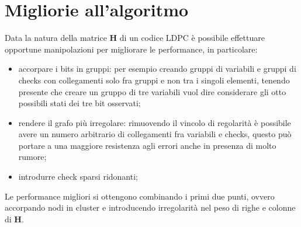 	\section{Migliorie all'algoritmo}

	Data la natura della matrice \textbf{H} di un codice LDPC è possibile effettuare opportune manipolazioni per migliorare le performance, in particolare:

	\begin{itemize}
		\item accorpare i bits in gruppi: per esempio creando gruppi di variabili e gruppi di checks con collegamenti solo fra gruppi e non tra i singoli elementi, tenendo presente che creare un gruppo di tre variabili vuol dire considerare gli otto possibili stati dei tre bit osservati;
		\item rendere il grafo più irregolare: rimuovendo il vincolo di regolarità è possibile avere un numero arbitrario di collegamenti fra variabili e checks, questo può portare a una maggiore resistenza agli errori anche in presenza di molto rumore;
		\item introdurre check sparsi ridonanti;
	\end{itemize}

	Le performance migliori si ottengono combinando i primi due punti, ovvero accorpando nodi in cluster e introducendo irregolarità nel peso di righe e colonne di $\textbf{H}$.